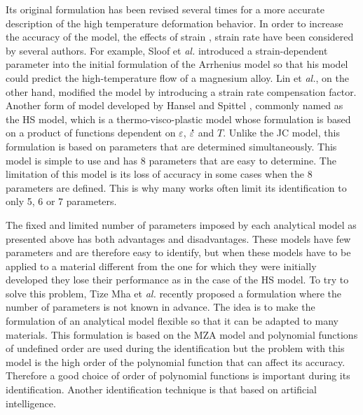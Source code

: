 \documentclass[twoside,english,1p,final,sort&compress]{elsarticle}
\makeatletter
\theoremstyle{plain}
\DeclareRobustCommand{\mdot}[1]{\accentset{\mbox{\bfseries .}}{#1}}
\DeclareRobustCommand{\eal}{et \emph{al.}\@\xspace}
\makeatother
\begin{document}
{Its original formulation has been revised several times for a more accurate description of the high temperature deformation behavior. In order to increase the accuracy of the model, the effects of strain \cite{Slooff-2007, Li-2012, Xu-2013}, strain rate \cite{Lin-2008-C, Mandal-2009} have been considered by several authors. For example, Sloof \eal \cite{Slooff-2007} introduced a strain-dependent parameter into the initial formulation of the Arrhenius model so that his model could predict the high-temperature flow of a magnesium alloy. Lin \eal \cite{Lin-2008-C}, on the other hand, modified the model by introducing a strain rate compensation factor. Another form of model developed by Hansel and Spittel \cite{Hensel-1978}, commonly named as the HS model, which is a thermo-visco-plastic model whose formulation is based on a product of functions dependent on $\varepsilon$, $\mdot\varepsilon$ and $T$. Unlike the JC model, this formulation is based on parameters that are determined simultaneously. This model is simple to use and has 8 parameters that are easy to determine. The limitation of this model is its loss of accuracy in some cases when the 8 parameters are defined.
This is why many works often limit its identification to only 5, 6 or 7 parameters}.

The fixed and limited number of parameters imposed by each analytical model as presented above has both advantages and disadvantages.
These models have few parameters and are therefore easy to identify, but when these models have to be applied to a material different from the one for which they were initially developed they lose their performance as in the case of the HS model.
To try to solve this problem, Tize Mha \eal \cite{TizeMha-2022} recently proposed a formulation where the number of parameters is not known in advance. The idea is to make the formulation of an analytical model flexible so that it can be adapted to many materials. This formulation is based on the MZA model and polynomial functions of undefined order are used during the identification but the problem with this model is the high order of the polynomial function that can affect its accuracy. Therefore a good choice of order of polynomial functions is important during its identification. Another identification technique is that based on artificial intelligence.
\end{document}

